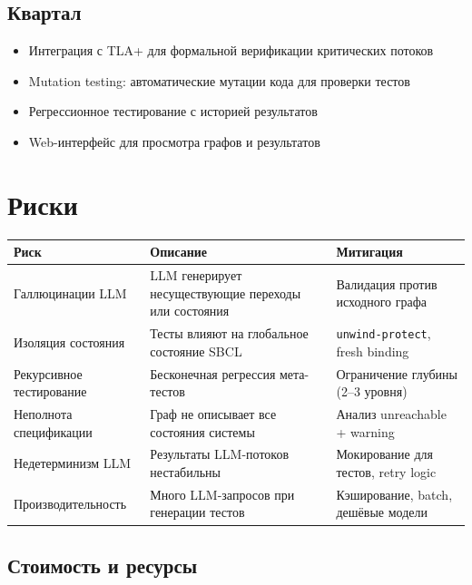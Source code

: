 \documentclass[10pt, oneside]{article}
\begin{document}
\subsection{Квартал}

\begin{itemize}[leftmargin=1.5em]
  \item Интеграция с TLA+ для формальной верификации критических потоков
  \item Mutation testing: автоматические мутации кода для проверки тестов
  \item Регрессионное тестирование с историей результатов
  \item Web-интерфейс для просмотра графов и результатов
\end{itemize}

\section{Риски}

\begin{center}
\begin{tabularx}{\textwidth}{lLl}
  \toprule
  \textbf{Риск} & \textbf{Описание} & \textbf{Митигация} \\
  \midrule
  Галлюцинации LLM
    & LLM генерирует несуществующие переходы или состояния
    & Валидация против исходного графа \\
  Изоляция состояния
    & Тесты влияют на глобальное состояние SBCL
    & \texttt{unwind-protect}, fresh binding \\
  Рекурсивное тестирование
    & Бесконечная регрессия мета-тестов
    & Ограничение глубины (2--3 уровня) \\
  Неполнота спецификации
    & Граф не описывает все состояния системы
    & Анализ unreachable + warning \\
  Недетерминизм LLM
    & Результаты LLM-потоков нестабильны
    & Мокирование для тестов, retry logic \\
  Производительность
    & Много LLM-запросов при генерации тестов
    & Кэширование, batch, дешёвые модели \\
  \bottomrule
\end{tabularx}
\end{center}

\subsection{Стоимость и ресурсы}
\end{document}
